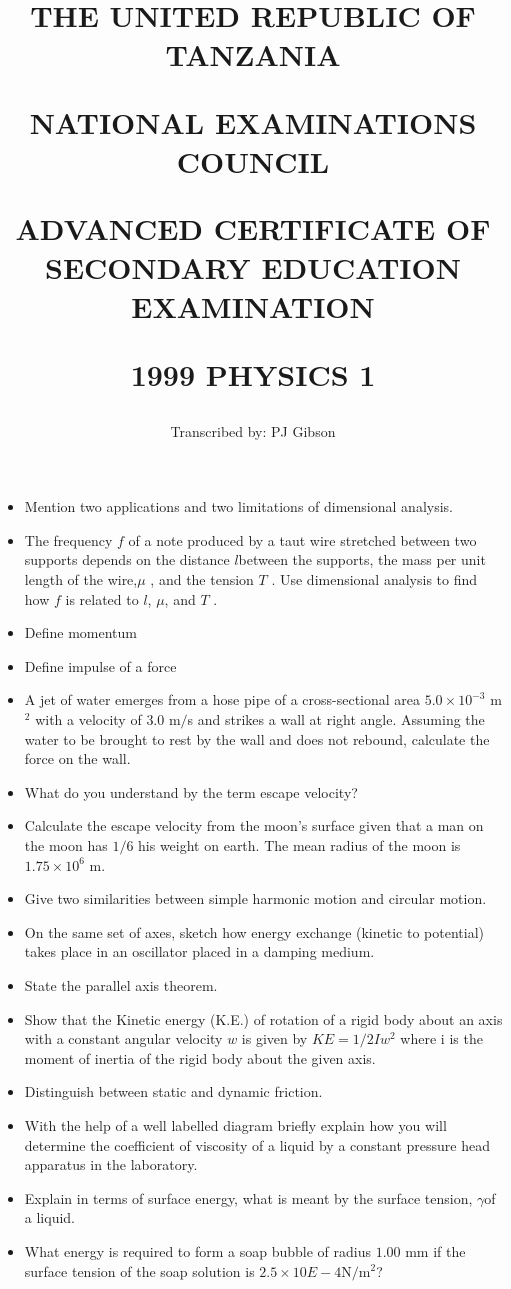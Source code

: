 \documentclass{article}
\title{THE UNITED REPUBLIC OF TANZANIA

NATIONAL EXAMINATIONS COUNCIL

ADVANCED CERTIFICATE OF SECONDARY EDUCATION EXAMINATION

\textbf{1999 PHYSICS 1}}
\author{Transcribed by:  PJ Gibson}
\begin{document}
\maketitle

\begin{itemize}
\item Mention two applications and two limitations of dimensional analysis.
\item The frequency $ f$ of a note produced by a taut wire stretched between two supports depends on the distance ​ $ l$ ​ between the supports, the mass per unit length of the wire,$ \mu $ , and the tension $ T$ . Use dimensional analysis to find how $ f$ is related to ​ $ l$ ​ , $\mu$, and $ T$ .
\item Define momentum
\item Define impulse of a force
\item A jet of water emerges from a hose pipe of a cross-sectional area $ 5.0\times 10^{-3}$ m​$ ^{2}$ with a velocity of $ 3.0$ m$/$s and strikes a wall at right angle. Assuming the water to be brought to rest by the wall and does not rebound, calculate the force on the wall.
\item What do you understand by the term escape velocity?
\item Calculate the escape velocity from the moon’s surface given that a man on the moon has $ 1/6$ his weight on earth. The mean radius of the moon is $ 1.75 \times 10^6$ m.
\item Give two similarities between simple harmonic motion and circular motion.
\item On the same set of axes, sketch how energy exchange (kinetic to potential) takes place in an oscillator placed in a damping medium.
\item State the parallel axis theorem.
\item Show that the Kinetic energy (K.E.) of rotation of a rigid body about an axis with a constant angular velocity $ w$ is given by $ KE =1/2Iw^{2}$ where i is the moment of inertia of the rigid body about the given axis.
\item Distinguish between static and dynamic friction.
\item With the help of a well labelled diagram briefly explain how you will determine the coefficient of viscosity of a liquid by a constant pressure head apparatus in the laboratory.
\item Explain in terms of surface energy, what is meant by the surface tension, ​ $ \gamma $ ​ of a liquid. 
\item What energy is required to form a soap bubble of radius $ 1.00$ mm if the surface tension of the soap solution is $ 2.5 \times 10$ ​$ E-4$ ​ N$/$m$ ^{2}$ ​ ?

\end{itemize}
\end{document}
